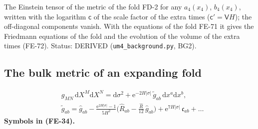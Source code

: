 \documentclass[
  10pt,
]{article}
\begin{document}
The Einstein tensor of the metric of the fold FD-2 for any \(a_4(x_4)\),
\(b_4(x_4)\), written with the logarithm \(\mathsf{c}\) of the scale
factor of the extra times (\(\mathsf{c}' = \mathsf{V}H\)); the
off-diagonal components vanish. With the equations of the fold FE-71 it
gives the Friedmann equations of the fold and the evolution of the
volume of the extra times (FE-72). Status: DERIVED
(\texttt{um4\_background.py}, BG2).

\hypertarget{the-bulk-metric-of-an-expanding-fold}{%
\subsection{The bulk metric of an expanding
fold}\label{the-bulk-metric-of-an-expanding-fold}}

\[
\begin{aligned}
&g_{MN}\,\mathrm{d}X^M\mathrm{d}X^N = \mathrm{d}\sigma^2 + \mathrm{e}^{-2H\lvert\sigma\rvert}\,\tilde g_{ab}\,\mathrm{d}x^a\mathrm{d}x^b,\\
&\tilde g_{ab} = \hat g_{ab} - \frac{\mathrm{e}^{2H\lvert\sigma\rvert} - 1}{5H^2}\Big(\hat R_{ab} - \frac{\hat R}{12}\,\hat g_{ab}\Big)
 + \mathrm{e}^{7H\lvert\sigma\rvert}\,\mathfrak{c}_{ab} + \dots
\end{aligned} \tag{FE-34}
\] \textbf{Symbols in (FE-34).}
\end{document}
